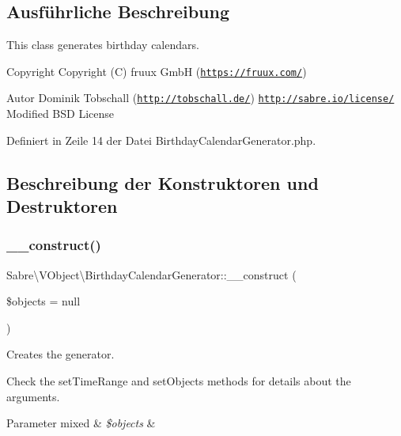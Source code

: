 \subsection{Ausführliche Beschreibung}
This class generates birthday calendars.

\begin{DoxyCopyright}{Copyright}
Copyright (C) fruux GmbH (\href{https://fruux.com/}{\tt https\+://fruux.\+com/}) 
\end{DoxyCopyright}
\begin{DoxyAuthor}{Autor}
Dominik Tobschall (\href{http://tobschall.de/}{\tt http\+://tobschall.\+de/})  \href{http://sabre.io/license/}{\tt http\+://sabre.\+io/license/} Modified B\+SD License 
\end{DoxyAuthor}


Definiert in Zeile 14 der Datei Birthday\+Calendar\+Generator.\+php.



\subsection{Beschreibung der Konstruktoren und Destruktoren}
\mbox{\label{class_sabre_1_1_v_object_1_1_birthday_calendar_generator_a0f5c3bec25e4ef73ae29fd7042a916e1}} 
\subsubsection{\texorpdfstring{\+\_\+\+\_\+construct()}{\_\_construct()}}
{\footnotesize\ttfamily Sabre\textbackslash{}\+V\+Object\textbackslash{}\+Birthday\+Calendar\+Generator\+::\+\_\+\+\_\+construct (\begin{DoxyParamCaption}\item[{}]{\$objects = {\ttfamily null} }\end{DoxyParamCaption})}

Creates the generator.

Check the set\+Time\+Range and set\+Objects methods for details about the arguments.


\begin{DoxyParams}[1]{Parameter}
mixed & {\em \$objects} & \\
\hline
\end{DoxyParams}



